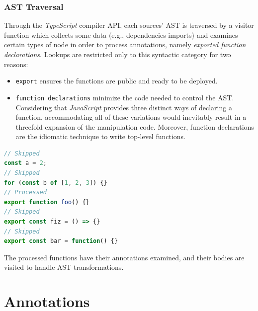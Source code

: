 \subsubsection{AST Traversal}

Through the \textit{TypeScript} compiler API, each sources' AST is traversed
by a visitor function which collects some data (e.g., dependencies imports) and examines
certain types of node in order to process annotations, namely \textit{exported function declarations}.
Lookups are restricted only to this syntactic category for two reasons:
\begin{itemize}
  \item \verb|export| ensures the functions are public and ready to be deployed.
  \item \verb|function declarations| minimize the code needed to control the AST.
    Considering that \textit{JavaScript} provides three distinct ways of declaring a function,
    accommodating all of these variations would inevitably result in a threefold expansion of the manipulation code.
    Moreover, function declarations are the idiomatic technique to write top-level functions.
\end{itemize}

\begin{lstlisting}[language=javascript, caption={Examples of processed or skipped nodes.}]
// Skipped
const a = 2;
// Skipped
for (const b of [1, 2, 3]) {}
// Processed
export function foo() {}
// Skipped
export const fiz = () => {}
// Skipped
export const bar = function() {}
\end{lstlisting}

The processed functions have their annotations examined, and
their bodies are visited to handle AST transformations.

\section{Annotations}

